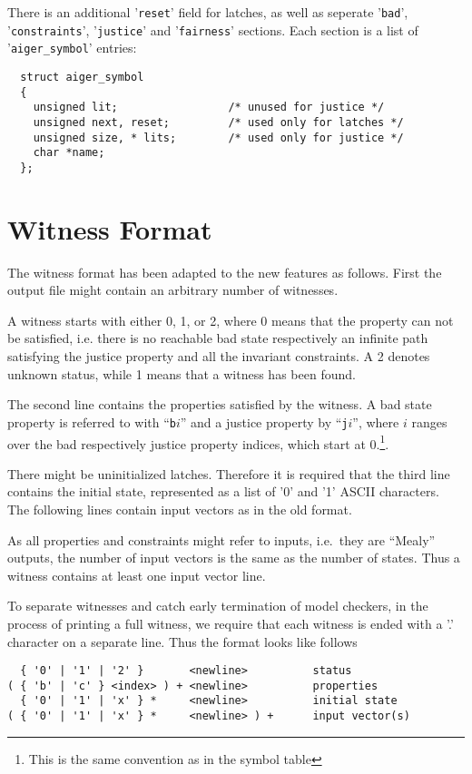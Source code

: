 \documentclass{llncs}
\begin{document}
There is an additional '\texttt{reset}' field for latches, as well as 
seperate '\texttt{bad}', '\texttt{constraints}', '\texttt{justice}' and
'\texttt{fairness}' sections.  Each section
is a list of '\texttt{aiger\_symbol}' entries:

{\small
\begin{verbatim}
  struct aiger_symbol
  {
    unsigned lit;                 /* unused for justice */
    unsigned next, reset;         /* used only for latches */
    unsigned size, * lits;        /* used only for justice */
    char *name;
  };
\end{verbatim}}

\section{Witness Format}

The witness format has been adapted to the new features as follows.
First the output file might contain an arbitrary number of witnesses.

A witness starts with either 0, 1, or 2, where 0 means that the property can
not be satisfied, i.e. there is no reachable bad state respectively an
infinite path satisfying the justice property and all the invariant
constraints.  A 2 denotes unknown status, while 1 means that a witness
has been found.

The second line contains the properties satisfied by the witness.
A bad state property is referred to with ``\texttt{b}$i$'' and a
justice property by ``\texttt{j}$i$'', where $i$ ranges over the bad
respectively justice property indices, which start at 0.\footnote{This is 
the same convention as in the symbol table}.

There might be uninitialized latches.  Therefore it is required that the third
line contains the initial state, represented as a list of '0' and '1' ASCII
characters.  The following lines contain input vectors as in the old format.

As all properties and constraints might refer to inputs, i.e.~they are ``Mealy''
outputs, the number of input vectors is the same as the number of states.
Thus a witness contains at least one input vector line.

To separate witnesses and catch early termination of model checkers, in the
process of printing a full witness, we require that each witness is
ended with a '.' character on a separate line.
Thus the format looks like follows
{\small
\begin{verbatim}
  { '0' | '1' | '2' }       <newline>          status
( { 'b' | 'c' } <index> ) + <newline>          properties
  { '0' | '1' | 'x' } *     <newline>          initial state
( { '0' | '1' | 'x' } *     <newline> ) +      input vector(s)
\end{verbatim}}
\end{document}
